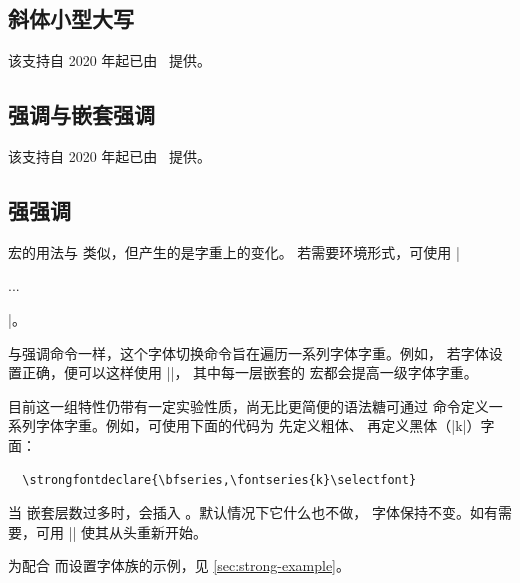 \documentclass[a4paper]{l3doc}
\begin{document}
\subsection{斜体小型大写}

该支持自 2020 年起已由 \LaTeXe\ 提供。


\subsection{强调与嵌套强调}

该支持自 2020 年起已由 \LaTeXe\ 提供。


\subsection{强强调}

\DescribeMacro{\strong}
\DescribeMacro{\strongenv}
 宏的用法与  类似，但产生的是字重上的变化。
若需要环境形式，可使用 |\begin{strongenv}...\end{strongenv}|。

与强调命令一样，这个字体切换命令旨在遍历一系列字体字重。例如，
若字体设置正确，便可以这样使用 ||，
其中每一层嵌套的  宏都会提高一级字体字重。

\DescribeMacro{\strongfontdeclare}
目前这一组特性仍带有一定实验性质，尚无比更简便的语法糖可通过 
命令定义一系列字体字重。例如，可使用下面的代码为  先定义粗体、
再定义黑体（|k|）字面：
\begin{Verbatim}
  \strongfontdeclare{\bfseries,\fontseries{k}\selectfont}
\end{Verbatim}

\DescribeMacro{\strongreset}
当  嵌套层数过多时，会插入 。默认情况下它什么也不做，
字体保持不变。如有需要，可用 |{\mdseries}|
使其从头重新开始。

为配合  而设置字体族的示例，见 \vref{sec:strong-example}。
\end{document}
